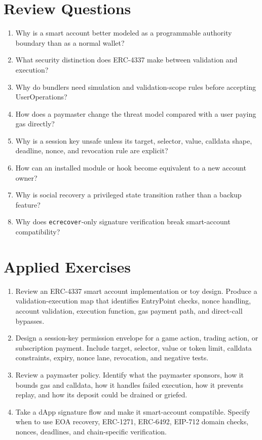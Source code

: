 \section*{Review Questions}

\begin{enumerate}
\item Why is a smart account better modeled as a programmable authority boundary than as a normal wallet?
\item What security distinction does ERC-4337 make between validation and execution?
\item Why do bundlers need simulation and validation-scope rules before accepting UserOperations?
\item How does a paymaster change the threat model compared with a user paying gas directly?
\item Why is a session key unsafe unless its target, selector, value, calldata shape, deadline, nonce, and revocation rule are explicit?
\item How can an installed module or hook become equivalent to a new account owner?
\item Why is social recovery a privileged state transition rather than a backup feature?
\item Why does \texttt{ecrecover}-only signature verification break smart-account compatibility?
\end{enumerate}

\section*{Applied Exercises}

\begin{enumerate}
\item Review an ERC-4337 smart account implementation or toy design. Produce a validation-execution map that identifies EntryPoint checks, nonce handling, account validation, execution function, gas payment path, and direct-call bypasses.

\item Design a session-key permission envelope for a game action, trading action, or subscription payment. Include target, selector, value or token limit, calldata constraints, expiry, nonce lane, revocation, and negative tests.

\item Review a paymaster policy. Identify what the paymaster sponsors, how it bounds gas and calldata, how it handles failed execution, how it prevents replay, and how its deposit could be drained or griefed.

\item Take a dApp signature flow and make it smart-account compatible. Specify when to use EOA recovery, ERC-1271, ERC-6492, EIP-712 domain checks, nonces, deadlines, and chain-specific verification.
\end{enumerate}
